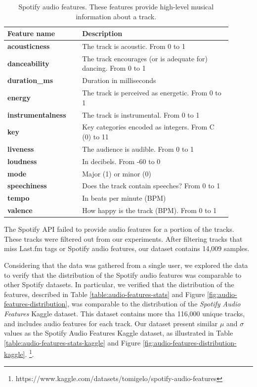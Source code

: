 \documentclass[sn-mathphys]{sn-jnl}%
\theoremstyle{thmstyleone}%
\theoremstyle{thmstyletwo}%
\theoremstyle{thmstylethree}%
\begin{document}
\begin{table}[h!]
      \centering
      \caption{Spotify audio features. These features provide high-level musical information about a track.} \label{table:spotify-features}
      \begin{tabular}{p{0.3\linewidth}p{0.6\linewidth}}
          \toprule
          \bfseries \textbf{Feature name} & \textbf{Description} \\
          \midrule
          \textbf{acousticness} & The track is acoustic. From 0 to 1 \\
          \textbf{danceability} & The track encourages (or is adequate for) dancing. From 0 to 1 \\
          \textbf{duration\_ms}  &  Duration in milliseconds \\
          \textbf{energy}  &  The track is perceived as energetic. From 0 to 1\\
          \textbf{instrumentalness}  &  The track is instrumental. From 0 to 1 \\
          \textbf{key}  &  Key categories encoded as integers. From C (0) to 11 \\
          \textbf{liveness}  &  The audience is audible. From 0 to 1\\
          \textbf{loudness}  &  In decibels. From -60 to 0 \\
          \textbf{mode}  & Major (1) or minor (0) \\
          \textbf{speechiness}  & Does the track contain speeches? From 0 to 1 \\
          \textbf{tempo}  & In beats per minute (BPM) \\
          \textbf{valence} & How happy is the track (BPM). From 0 to 1 \\
          \bottomrule
      \end{tabular}
  \end{table}

The Spotify API failed to provide audio features for a portion of the tracks.
These tracks were filtered out from our experiments.
After filtering tracks that miss Last.fm tags or Spotify audio features,
our dataset contains 14,009 samples.

Considering that the data was gathered from a single user,
we explored the data to verify that the distribution of the Spotify audio features
was comparable to other Spotify datasets.
In particular, we verified that the distribution of the features,
described in Table \ref{table:audio-features-stats} and Figure \ref{fig:audio-features-distribution},
was comparable to the distribution of the \emph{Spotify Audio Features} Kaggle dataset.
This dataset contains more tha 116,000 unique tracks, and includes audio features for each track.
Our dataset present similar $\mu$ and $\sigma$ values as the Spotify Audio Features Kaggle dataset,
as illustrated in Table \ref{table:audio-features-stats-kaggle} and Figure \ref{fig:audio-features-distribution-kaggle}.
\footnote[6]{https://www.kaggle.com/datasets/tomigelo/spotify-audio-features}.
\end{document}
